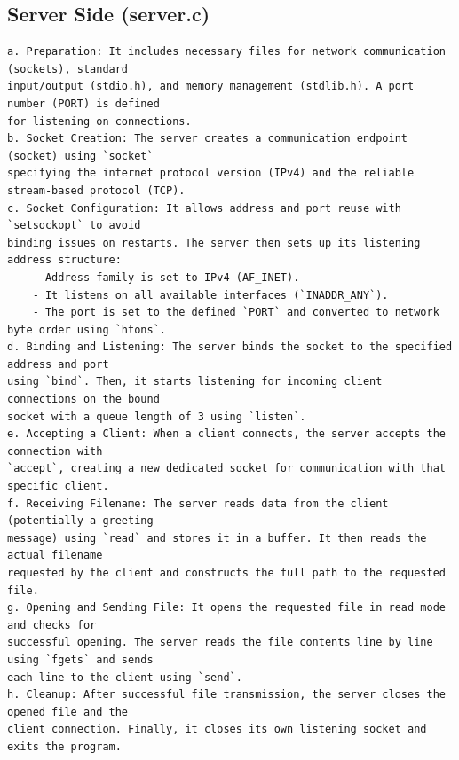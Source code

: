 \documentclass{article}
\begin{document}
\subsection{Server Side (server.c)}
\begin{verbatim}
a. Preparation: It includes necessary files for network communication (sockets), standard 
input/output (stdio.h), and memory management (stdlib.h). A port number (PORT) is defined 
for listening on connections.
b. Socket Creation: The server creates a communication endpoint (socket) using `socket` 
specifying the internet protocol version (IPv4) and the reliable stream-based protocol (TCP).
c. Socket Configuration: It allows address and port reuse with `setsockopt` to avoid 
binding issues on restarts. The server then sets up its listening address structure:
    - Address family is set to IPv4 (AF_INET).
    - It listens on all available interfaces (`INADDR_ANY`).
    - The port is set to the defined `PORT` and converted to network byte order using `htons`.
d. Binding and Listening: The server binds the socket to the specified address and port 
using `bind`. Then, it starts listening for incoming client connections on the bound 
socket with a queue length of 3 using `listen`.
e. Accepting a Client: When a client connects, the server accepts the connection with 
`accept`, creating a new dedicated socket for communication with that specific client.
f. Receiving Filename: The server reads data from the client (potentially a greeting 
message) using `read` and stores it in a buffer. It then reads the actual filename
requested by the client and constructs the full path to the requested file.
g. Opening and Sending File: It opens the requested file in read mode and checks for 
successful opening. The server reads the file contents line by line using `fgets` and sends 
each line to the client using `send`.
h. Cleanup: After successful file transmission, the server closes the opened file and the 
client connection. Finally, it closes its own listening socket and exits the program. 
\end{verbatim}
\end{document}
